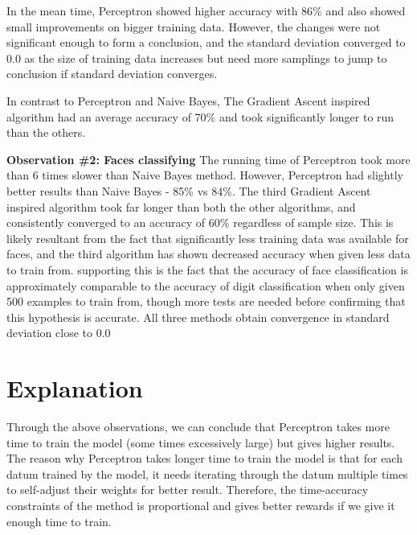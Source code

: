 \documentclass{article}
\begin{document}
In the mean time, Perceptron showed higher accuracy with 86\% and also showed small improvements on bigger training data. However, the changes were not significant enough to form a conclusion, and the standard deviation converged to 0.0 as the size of training data increases but need more samplings to jump to conclusion if standard deviation converges.

In contrast to Perceptron and Naive Bayes, The Gradient Ascent inspired algorithm had an average accuracy of 70\% and took significantly longer to run than the others. 

\textbf{Observation \#2: Faces classifying}
The running time of Perceptron took more than 6 times slower than Naive Bayes method. However, Perceptron had slightly better results than Naive Bayes - 85\% vs 84\%. The third Gradient Ascent inspired algorithm took far longer than both the other algorithms, and consistently converged to an accuracy of 60\% regardless of sample size. This is likely resultant from the fact that significantly less training data was available for faces, and the third algorithm has shown decreased accuracy when given less data to train from. supporting this is the fact that the accuracy of face classification is approximately comparable to the accuracy of digit classification when only given 500 examples to train from, though more tests are needed before confirming that this hypothesis is accurate. All three methods obtain convergence in standard deviation close to 0.0

\section{Explanation}
Through the above observations, we can conclude that Perceptron takes more time to train the model (some times excessively large) but gives higher results. The reason why Perceptron takes longer time to train the model is that for each datum trained by the model, it needs iterating through the datum multiple times to self-adjust their weights for better result. Therefore, the time-accuracy constraints of the method is proportional and gives better rewards if we give it enough time to train.
\end{document}
